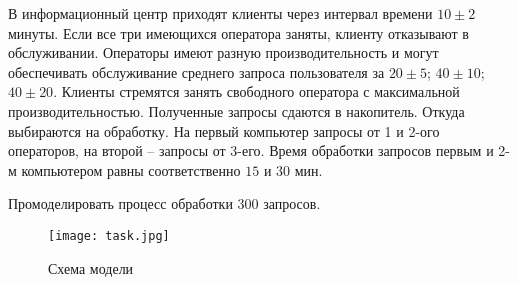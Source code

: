 В информационный центр приходят клиенты через интервал времени $10\pm2$ минуты. Если все три имеющихся оператора заняты, клиенту отказывают в обслуживании. Операторы имеют разную производительность и могут обеспечивать обслуживание среднего запроса пользователя за $20\pm5$; $40\pm10$; $40\pm20$. Клиенты стремятся занять свободного оператора с максимальной производительностью. Полученные запросы сдаются в накопитель. Откуда выбираются на обработку. На первый компьютер запросы от 1 и 2-ого операторов, на второй – запросы от 3-его. Время обработки запросов первым и 2-м компьютером равны соответственно $15$ и $30$ мин.

Промоделировать процесс обработки 300 запросов.

\begin{figure}[h]
	\begin{center}
		{\texttt{[image: task.jpg]}
			\caption{Схема модели}
			\label{pic:1}}
	\end{center}
\end{figure}